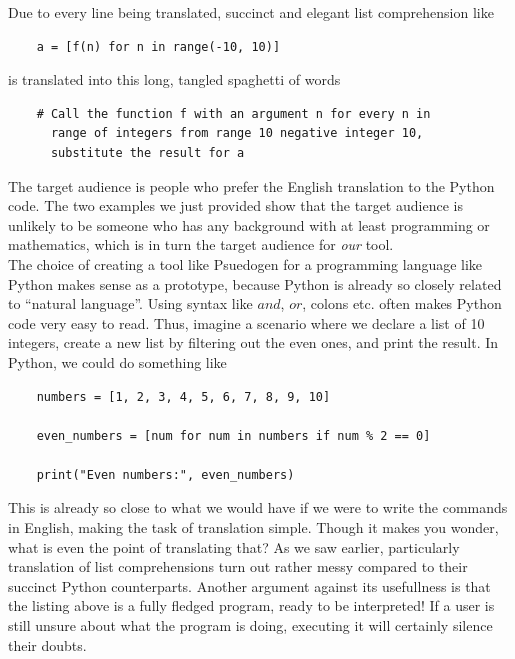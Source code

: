 Due to every line being translated, succinct and elegant list comprehension like

\begin{verbatim}
    a = [f(n) for n in range(-10, 10)]
\end{verbatim}

is translated into this long, tangled spaghetti of words

\begin{verbatim}
    # Call the function f with an argument n for every n in
      range of integers from range 10 negative integer 10,
      substitute the result for a
\end{verbatim}

The target audience is people who prefer the English translation to the Python code. The two examples we just provided show that the target audience is unlikely to be someone who has any background with at least programming or mathematics, which is in turn the target audience for \textit{our} tool. \hfill \\

The choice of creating a tool like Psuedogen for a programming language like Python makes sense as a prototype, because Python is already so closely related to ``natural language''. Using syntax like $and$, $or$, colons etc. often makes Python code very easy to read. Thus, imagine a scenario where we declare a list of 10 integers, create a new list by filtering out the even ones, and print the result. In Python, we could do something like

\begin{verbatim}
    numbers = [1, 2, 3, 4, 5, 6, 7, 8, 9, 10]

    even_numbers = [num for num in numbers if num % 2 == 0]

    print("Even numbers:", even_numbers)
\end{verbatim}

This is already so close to what we would have if we were to write the commands in English, making the task of translation simple. Though it makes you wonder, what is even the point of translating that? As we saw earlier, particularly translation of list comprehensions turn out rather messy compared to their succinct Python counterparts. Another argument against its usefullness is that the listing above is a fully fledged program, ready to be interpreted! If a user is still unsure about what the program is doing, executing it will certainly silence their doubts. \hfill \\

